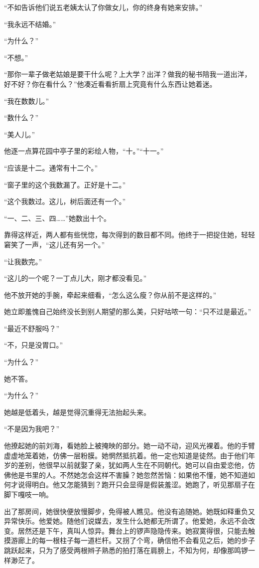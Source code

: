 \par “不如告诉他们说五老姨太认了你做女儿，你的终身有她来安排。”
\par “我永远不结婚。”
\par “为什么？”
\par “不想。”
\par “那你一辈子做老姑娘是要干什么呢？上大学？出洋？做我的秘书陪我一道出洋，好不好？你在看什么？”他凑近看看折扇上究竟有什么东西让她着迷。
\par “我在数数儿。”
\par “数什么？”
\par “美人儿。”
\par 他逐一点算花园中亭子里的彩绘人物，“十。”“十一。”
\par “应该是十二。通常有十二个。”
\par “窗子里的这个我数漏了。正好是十二。”
\par “这个我数过。这儿，树后面还有一个。”
\par “一、二、三、四……”她数出十个。
\par 靠得这样近，两人都有些恍惚，每次得到的数目都不同。他终于一把捉住她，轻轻窘笑了一声，“这儿还有另一个。”
\par “让我数完。”
\par “这儿的一个呢？一丁点儿大，刚才都没看见。”
\par 他不放开她的手腕，牵起来细看，“怎么这么瘦？你从前不是这样的。”
\par 她立即羞愧自己始终没长到别人期望的那么美，只好咕哝一句：“只不过是最近。”
\par “最近不舒服吗？”
\par “不，只是没胃口。”
\par “为什么？”
\par 她不答。
\par “为什么？”
\par 她越是低着头，越是觉得沉重得无法抬起头来。
\par “不是因为我吧？”
\par 他撩起她的前刘海，看她脸上被掩映的部分。她一动不动，迎风光裸着。他的手臂虚虚地笼着她，仿佛一层粉膜。她惘然抵抗着。他一定也知道是徒然。由于他们年岁的差别，他很早以前就娶了亲，犹如两人生在不同朝代。她可以自由爱恋他，仿佛他是书里的人。不然她怎会这样不害臊？她忽然苦恼：如果他不懂，她不知道如何才说得明白。他又怎能猜到？跑开只会显得是假装羞涩。她跑了，听见那扇子在脚下嘎吱一响。
\par 出了那房间，她很快便放慢脚步，免得被人瞧见。他没有追随她。她既如释重负又异常快乐。他爱她。随他们说媒去，发生什么她都无所谓了。他爱她，永远不会改变。居然还是下午，真叫人惊异。舞台上的锣声隐隐传来。她寂寞得很，只能去触摸游廊上的每一根柱子每一道栏杆。又拐了个弯，确信他不会看见之后，她的步子跳跃起来，只为了感受两根辫子熟悉的拍打落在肩膀上，不知为何，却像那鸣锣一样渺茫了。




